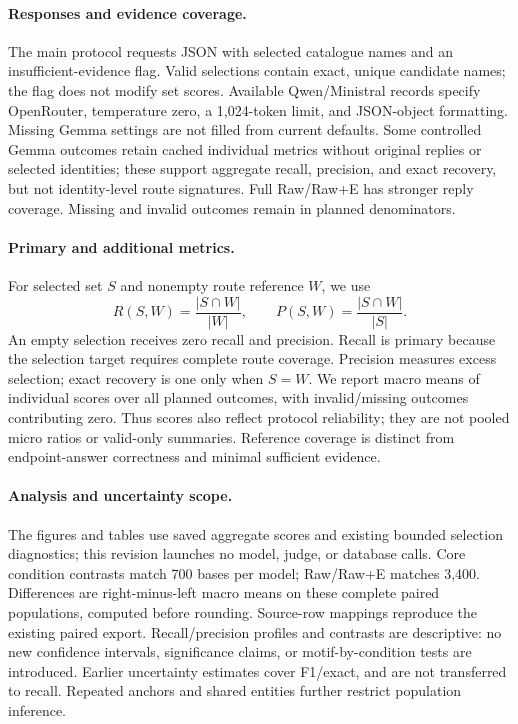 \paragraph{Responses and evidence coverage.}
The main protocol requests JSON with selected catalogue names and an insufficient-evidence flag. Valid selections contain exact, unique candidate names; the flag does not modify set scores. Available Qwen/Ministral records specify OpenRouter, temperature zero, a 1,024-token limit, and JSON-object formatting. Missing Gemma settings are not filled from current defaults. Some controlled Gemma outcomes retain cached individual metrics without original replies or selected identities; these support aggregate recall, precision, and exact recovery, but not identity-level route signatures. Full Raw/Raw+E has stronger reply coverage. Missing and invalid outcomes remain in planned denominators.

\paragraph{Primary and additional metrics.}
For selected set $S$ and nonempty route reference $W$, we use
\begin{equation}
 R(S,W)=\frac{|S\cap W|}{|W|},\qquad
 P(S,W)=\frac{|S\cap W|}{|S|}.
\end{equation}
An empty selection receives zero recall and precision. Recall is primary because the selection target requires complete route coverage. Precision measures excess selection; exact recovery is one only when $S=W$. We report macro means of individual scores over all planned outcomes, with invalid/missing outcomes contributing zero. Thus scores also reflect protocol reliability; they are not pooled micro ratios or valid-only summaries. Reference coverage is distinct from endpoint-answer correctness and minimal sufficient evidence.

\paragraph{Analysis and uncertainty scope.}
The figures and tables use saved aggregate scores and existing bounded selection diagnostics; this revision launches no model, judge, or database calls. Core condition contrasts match 700 bases per model; Raw/Raw+E matches 3,400. Differences are right-minus-left macro means on these complete paired populations, computed before rounding. Source-row mappings reproduce the existing paired export. Recall/precision profiles and contrasts are descriptive: no new confidence intervals, significance claims, or motif-by-condition tests are introduced. Earlier uncertainty estimates cover F1/exact, and are not transferred to recall. Repeated anchors and shared entities further restrict population inference.

